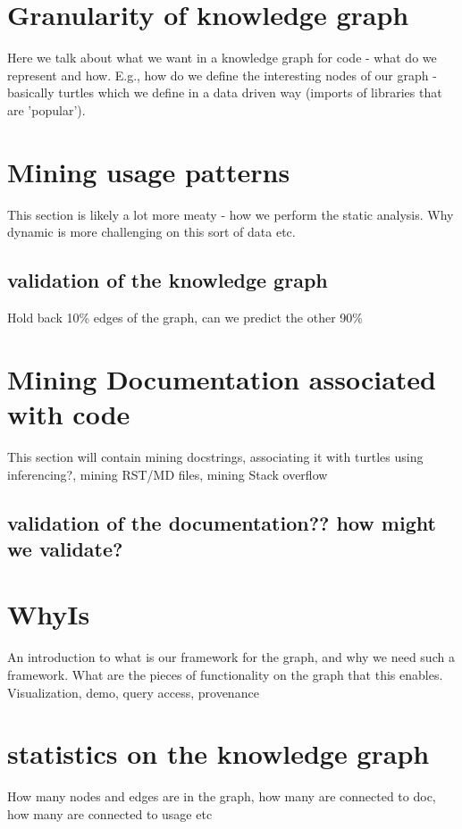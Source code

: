 \section{Granularity of knowledge graph}
Here we talk about what we want in a knowledge graph for code - what do we represent and how.  E.g., how do we define the interesting nodes of our graph - basically turtles which we define in a data driven way (imports of libraries that are 'popular').
\section{Mining usage patterns}
This section is likely a lot more meaty - how we perform the static analysis.  Why dynamic is more challenging on this sort of data etc.



\subsection{validation of the knowledge graph}
Hold back 10\% edges of the graph, can we predict the other 90\%
\section{Mining Documentation associated with code}
This section will contain mining docstrings, associating it with turtles using inferencing?, mining RST/MD files, mining Stack overflow
\subsection{validation of the documentation?? how might we validate?}
\section{WhyIs} An introduction to what is our framework for the graph, and why we need such a framework.  What are the pieces of functionality on the graph that this enables. Visualization, demo, query access, provenance 
\section{statistics on the knowledge graph}
How many nodes and edges are in the graph, how many are connected to doc, how many are connected to usage etc
